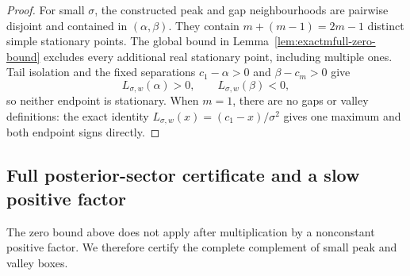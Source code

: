 \documentclass[aps,physrev,onecolumn,amsmath,amssymb,longbibliography]{revtex4-2}
\begin{document}
\begin{proof}
For small \(\sigma\), the constructed peak and gap neighbourhoods are
pairwise disjoint and contained in \((\alpha,\beta)\).  They contain
\(m+(m-1)=2m-1\) distinct simple stationary points.  The global bound in
Lemma~\ref{lem:exactmfull-zero-bound} excludes every additional real
stationary point, including multiple ones.  Tail isolation and the fixed
separations \(c_1-\alpha>0\) and \(\beta-c_m>0\) give
\begin{equation}
 L_{\sigma,w}(\alpha)>0,
 \qquad L_{\sigma,w}(\beta)<0,
 \label{eq:exactmfull-endpoint-signs}
\end{equation}
so neither endpoint is stationary.  When \(m=1\), there are no gaps or
valley definitions: the exact identity
\(L_{\sigma,w}(x)=(c_1-x)/\sigma^2\) gives one maximum and both endpoint
signs directly.
\end{proof}

\subsection{Full posterior-sector certificate and a slow positive factor}
\label{subsec:exactmfull-slow-factor}

The zero bound above does not apply after multiplication by a nonconstant
positive factor.  We therefore certify the complete complement of small peak
and valley boxes.
\end{document}
